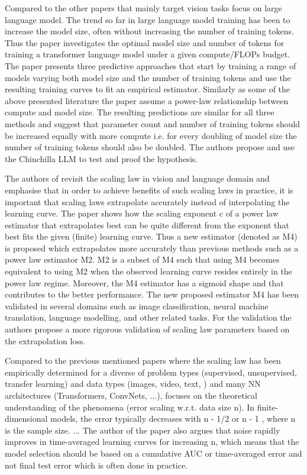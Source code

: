\documentclass{article} %
\begin{document}
Compared to the other papers that mainly target vision tasks \cite{hoffmann2022training} focus on large language model. The trend so far in large language model training has been to increase the model size, often without increasing the number of training tokens. Thus the paper investigates the optimal model size and number of tokens for training a transformer language model under a given compute/FLOPs budget. The paper presents three predictive approaches that start by training a range of models varying both model size and the number of training tokens and use the resulting training curves to fit an empirical estimator. Similarly as some of the above presented literature the paper assume a power-law relationship between compute and model size. The resulting predictions are similar for all three methods and suggest that parameter count and number of training tokens should be increased equally with more compute i.e. for every doubling of model size the number of training tokens should also be doubled. The authors propose and use the Chinchilla LLM to test and proof the hypothesis.

The authors of \cite{alabdulmohsin2022revisiting} revisit the scaling law in vision and language domain and emphasise that in order to achieve benefits of such scaling laws in practice, it is important that scaling laws extrapolate accurately instead of interpolating the learning curve. The paper shows how the scaling exponent c of a power law estimator that extrapolates best can be quite different from the exponent that best fits the given (finite) learning curve. Thus a new estimator (denoted as M4) is proposed which extrapolates more accurately than previous methods such as a power law estimator M2. M2 is a subset of M4 such that using M4 becomes equivalent to using M2 when the observed learning curve resides entirely in the power law regime. Moreover, the M4 estimator has a sigmoid shape and that contributes to the better performance. The new proposed estimator M4 has been validated in several domains such as image classification, neural machine translation, language modelling, and other related tasks. For the validation the authors propose a more rigorous validation of scaling law parameters based on the extrapolation loss.

Compared to the previous mentioned papers where the scaling law has been empirically determined for a diverse of problem types (supervised, unsupervised, transfer learning) and data types (images, video, text, ) and many NN architectures (Transformers, ConvNets, ...), \cite{hutter2021learning} focuses on the theoretical understanding of the phenomena (error scaling w.r.t. data size n). In finite-dimensional models, the error typically decreases with n - 1/2 or n - 1 , where n is the sample size. ... The author of the paper also argues that noise rapidly improves in time-averaged learning curves for increasing n, which means that the model selection should be based on a cumulative AUC or time-averaged error and not final test error which is often done in practice.
\end{document}
